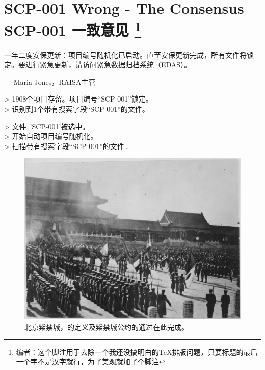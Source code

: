 \chapter[SCP-001 一致意见]{
	SCP-001 Wrong - The Consensus \\
	SCP-001 一致意见
	\footnote{编者\QIS：这个脚注用于去除一个我还没搞明白的\TeX 排版问题，只要标题的最后一个字不是汉字就行，为了美观就加了个脚注\label{foot:fix}}
}

\label{chap:SCP-001.the.consensus}


\begin{scpbox}[colback=ftwoftwoctwo, center upper]


一年二度安保更新：项目编号随机化已启动。直至安保更新完成，所有文件将锁定。要进行紧急更新，请访问紧急数据归档系统（EDAS）。

— Maria Jones，RAISA主管

\end{scpbox}

\hr

\begin{scpboxcmd}

> 1908个项目存留。项目编号“SCP-001”锁定。 \\
> 识别到1个带有搜索字段“SCP-001”的文件。

> 文件~'SCP-001'被选中。 \\
> 开始自动项目编号随机化。 \\
> 扫描带有搜索字段“SCP-001”的文件…

\end{scpboxcmd}

\hr

\begin{figure}[H]
	\centering
	\includegraphics{images/SCP.001.the.consensus.jpg}
	\caption*{北京紫禁城，的定义及紫禁城公约的通过在此完成。}
\end{figure}

